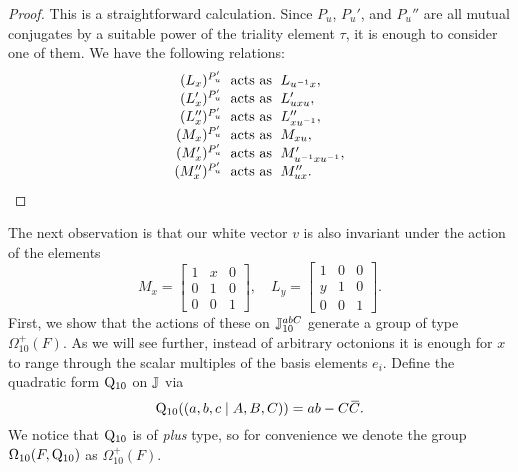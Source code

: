 \begin{proof}
	This is a straightforward calculation. Since $P_u$, $P_u'$, and $P_u''$ are all mutual conjugates by a suitable power of the triality element
	$\tau$, it is enough to consider one of them. We have 
	the following relations:
	\begin{equation}
		\begin{array}{r@{\;}c@{\;}l}
			(L_x)^{P_u'} & \text{ acts as } & L_{u^{-1} x}, \\
			(L_x')^{P_u'} & \text{ acts as } & L_{u x u}', \\
			(L_x'')^{P_u'} & \text{ acts as } & L_{x u^{-1}}'', \\
			(M_x)^{P_u'} & \text{ acts as } & M_{x u}, \\
			(M_x')^{P_u'} & \text{ acts as } & M_{u^{-1} x u^{-1}}', \\
			(M_x'')^{P_u'} & \text{ acts as } & M_{u x}''.
		\end{array}
	\end{equation}
	\par \vspace{-1.6\baselineskip} \qedhere
\end{proof}
\noindent The next observation is that our white vector $v$ is also invariant under the action of the
elements
    \begin{equation}
        M_x = \begin{bmatrix}
            1&x&0\\
            0&1&0\\
            0&0&1
        \end{bmatrix},\quad 
        L_y = \begin{bmatrix}
            1&0&0\\
            y&1&0\\
            0&0&1
        \end{bmatrix}.
    \end{equation}
First, we show that the actions of these on $\mathbb{J}_{10}^{abC}$ generate a group 
of type $\Omega_{10}^+(F)$. As we will see further, instead of arbitrary octonions
it is enough for $x$ to range through the scalar multiples of the basis elements $e_i$.
Define the quadratic form $\mathord{\mathrm{Q}}_{10}$ on $\mathbb{J}$ via
\begin{equation}
	\mathord{\mathrm{Q}}_{10}((a,b,c\mid A,B,C)) = ab - C\mathord{\mbox{\hspace*{0pt}}\,\overline{\!C\!\!\;}\!\:}\mbox{\hspace*{0pt}}. 
\end{equation}
We notice that $\mathord{\mathrm{Q}}_{10}$ is of \textit{plus} type, so for convenience we
denote the group $\Omega_{10}(F,\mathord{\mathrm{Q}}_{10})$ as $\Omega_{10}^+(F)$. 

